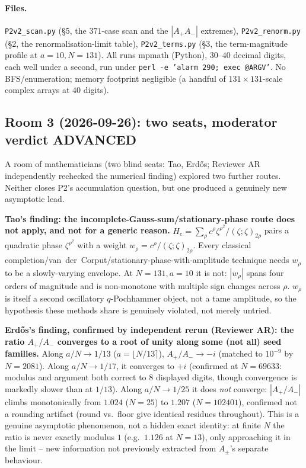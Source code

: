 \documentclass[11pt]{article}
\theoremstyle{remark}\newtheorem{remark}[theorem]{Remark}
\begin{document}
\paragraph{Files.} \texttt{P2v2\_scan.py} (\S5, the $371$-case scan and the $|A_+A_-|$ extremes), \texttt{P2v2\_renorm.py}
(\S2, the renormalisation-limit table), \texttt{P2v2\_terms.py} (\S3, the term-magnitude profile at $a=10,N=131$). All runs
mpmath (Python), $30$--$40$ decimal digits, each well under a second, run under \texttt{perl -e 'alarm 290; exec @ARGV'}.
No BFS/enumeration; memory footprint negligible (a handful of $131\times131$-scale complex arrays at $40$ digits).


\subsection*{Room 3 (2026-09-26): two seats, moderator verdict ADVANCED}

A room of mathematicians (two blind seats: Tao, Erd\H os; Reviewer AR independently rechecked
the numerical finding) explored two further routes. Neither closes P2's accumulation question,
but one produced a genuinely new asymptotic lead.

\textbf{Tao's finding: the incomplete-Gauss-sum/stationary-phase route does not apply, and not for
a generic reason.} $H_e=\sum_\rho c^\rho\zeta^{\rho^2}/(\zeta;\zeta)_{2\rho}$ pairs a quadratic
phase $\zeta^{\rho^2}$ with a weight $w_\rho=c^\rho/(\zeta;\zeta)_{2\rho}$. Every classical
completion/van~der~Corput/stationary-phase-with-amplitude technique needs $w_\rho$ to be a
slowly-varying envelope. At $N=131,a=10$ it is not: $|w_\rho|$ spans four orders of magnitude and
is non-monotone with multiple sign changes across $\rho$. $w_\rho$ is itself a second oscillatory
$q$-Pochhammer object, not a tame amplitude, so the hypothesis these methods share is genuinely
violated, not merely untried.

\textbf{Erd\H os's finding, confirmed by independent rerun (Reviewer AR): the ratio $A_+/A_-$
converges to a root of unity along some (not all) seed families.} Along $a/N\to1/13$
($a=\lfloor N/13\rceil$), $A_+/A_-\to-i$ (matched to $10^{-9}$ by $N=2081$). Along $a/N\to1/17$,
it converges to $+i$ (confirmed at $N=69633$: modulus and argument both correct to 8 displayed
digits, though convergence is markedly slower than at $1/13$). Along $a/N\to1/25$ it does
\emph{not} converge: $|A_+/A_-|$ climbs monotonically from $1.024$ ($N=25$) to $1.207$
($N=102401$), confirmed not a rounding artifact (round vs.\ floor give identical residues
throughout). This is a genuine asymptotic phenomenon, not a hidden exact identity: at finite $N$
the ratio is never exactly modulus $1$ (e.g.\ $1.126$ at $N=13$), only approaching it in the
limit -- new information not previously extracted from $A_\pm$'s separate behaviour.
\end{document}
